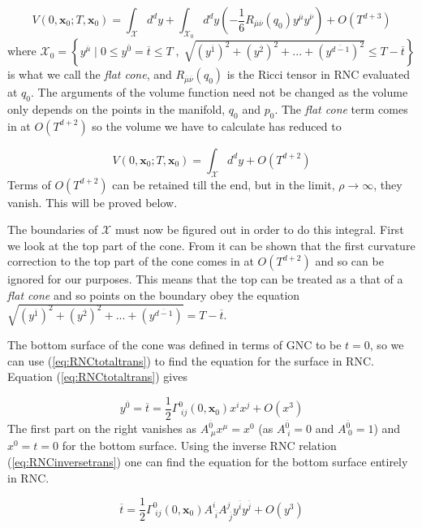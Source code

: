 \documentclass[12pt]{article}
\newcommand{\be}{\begin{equation}}
\newcommand{\ee}{\end{equation}}
\begin{document}
\be\label{eq:VolumeWithRNC}
V(0,\mathbf{x}_0;T,\mathbf{x}_0) =\int_{\mathcal{X}}d^dy+\int_{\mathcal{X}_0}d^dy\left(-\frac{1}{6}R_{\overline{\mu}\overline{\nu}}(q_0)y^{\overline{\mu}}y^{\overline{\nu}} \right)+O(T^{d+3})
\ee
where $\mathcal{X}_0=\left\lbrace y^{\overline{\mu}} \mid 0\leq y^{\overline{0}}=\overline{t}\leq T\; ,\; \sqrt{(y^{\overline{1}})^2+(y^{\overline{2}})^2+...+(y^{\overline{d-1}})^2}\leq T-\overline{t} \right\rbrace$ is what we call the \textit{flat cone}, and $R_{\overline{\mu}\overline{\nu}}(q_0)$ is the Ricci tensor in RNC evaluated at $q_0$. The arguments of the volume function need not be changed as the volume only depends on the points in the manifold, $q_0$ and $p_0$. The \textit{flat cone} term comes in at $O(T^{d+2})$ so the volume we have to calculate has reduced to

\be\label{eq:VolumeToLowestOrder}
V(0,\mathbf{x}_0;T,\mathbf{x}_0) =\int_{\mathcal{X}}d^dy+O(T^{d+2})
\ee
Terms of $O(T^{d+2})$ can be retained till the end, but in the limit, $\rho\rightarrow\infty$, they vanish. This will be proved below.

The boundaries of $\mathcal{X}$ must now be figured out in order to do this integral. First we look at the top part of the cone. From \cite{Khetrapal_Sumati:Causal_Diamond_Volume} it can be shown that the first curvature correction to the top part of the cone comes in at $O(T^{d+2})$ and so can be ignored for our purposes. This means that the top can be treated as a that of a \textit{flat cone} and so points on the boundary obey the equation $\sqrt{(y^{\overline{1}})^2+(y^{\overline{2}})^2+...+(y^{\overline{d-1}})} = T-\overline{t}$.

The bottom surface of the cone was defined in terms of GNC to be $t=0$, so we can use (\ref{eq:RNCtotaltrans}) to find the equation for the surface in RNC. Equation (\ref{eq:RNCtotaltrans}) gives

\be\label{eq:BottomSurfaceWithGNC}
y^{\overline{0}}=\overline{t}=\frac{1}{2}\Gamma^{0}_{\;ij}(0,\mathbf{x}_0)x^i x^j+O(x^3)
\ee
The first part on the right vanishes as $A^{\overline{0}}_{\;\mu}x^{\mu}=x^0$ (as $A^{\overline{0}}_{\;i}=0$ and $A^{\overline{0}}_{\;0}=1$) and $x^0=t=0$ for the bottom surface. Using the inverse RNC relation (\ref{eq:RNCinversetrans}) one can find the equation for the bottom surface entirely in RNC.

\be\label{eq:BottomSurface}
\overline{t}=\frac{1}{2}\Gamma^{0}_{\;ij}(0,\mathbf{x}_0)A^{i}_{\;\overline{i}}A^{j}_{\;\overline{j}}y^{\overline{i}} y^{\overline{j}}+O(y^3)
\ee
\end{document}
